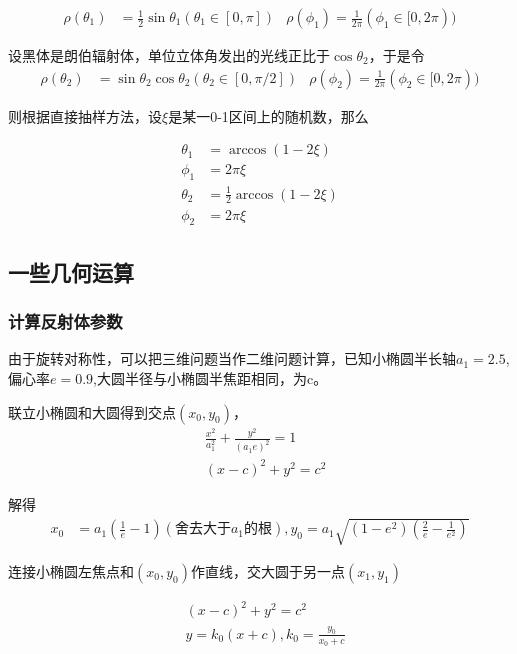 \documentclass[10pt, a4paper]{article}
\begin{document}
    \begin{align*}
        \rho(\theta_1)&= \frac{1}{2}\sin\theta_1(\theta_1\in[0,\pi]) & \rho(\phi_1)=\frac{1}{2\pi}(\phi_1\in[0,2\pi))
    \end{align*}

    设黑体是朗伯辐射体，单位立体角发出的光线正比于$\cos\theta_2$，于是令
    \begin{align*}
        \rho(\theta_2)&=\sin\theta_2\cos\theta_2(\theta_2\in[0,\pi/2])&\rho(\phi_2)=\frac{1}{2\pi}(\phi_2\in[0,2\pi))
    \end{align*}

    则根据直接抽样方法，设$\xi $是某一0-1区间上的随机数，那么
    
    \begin{align*}
        \theta_1&=\arccos(1-2\xi)\\
        \phi_1&=2\pi\xi\\
        \theta_2&=\frac{1}{2}\arccos(1-2\xi)\\
        \phi_2&=2\pi\xi
    \end{align*}

    \subsection{一些几何运算}

    \subsubsection{计算反射体参数}

    由于旋转对称性，可以把三维问题当作二维问题计算，已知小椭圆半长轴$a_1=2.5$,偏心率$e=0.9$,大圆半径与小椭圆半焦距相同，为c。

    联立小椭圆和大圆得到交点$(x_0,y_0)$，
    \begin{align*}
        &\frac{x^2}{a_1^2}+\frac{y^2}{(a_1e)^2}=1\\
        &(x-c)^2+y^2=c^2
    \end{align*}

    解得
    \begin{align*}
        x_0&=a_1(\frac{1}{e}-1)(\text{舍去大于}a_1\text{的根}),y_0=a_1\sqrt{(1-e^2)(\frac{2}{e}-\frac{1}{e^2})}
    \end{align*}

    连接小椭圆左焦点和$(x_0,y_0)$作直线，交大圆于另一点$(x_1,y_1)$

    \begin{align*}
        &(x-c)^2+y^2=c^2\\
        &y=k_0(x+c),k_0=\frac{y_0}{x_0+c}
    \end{align*}
\end{document}
